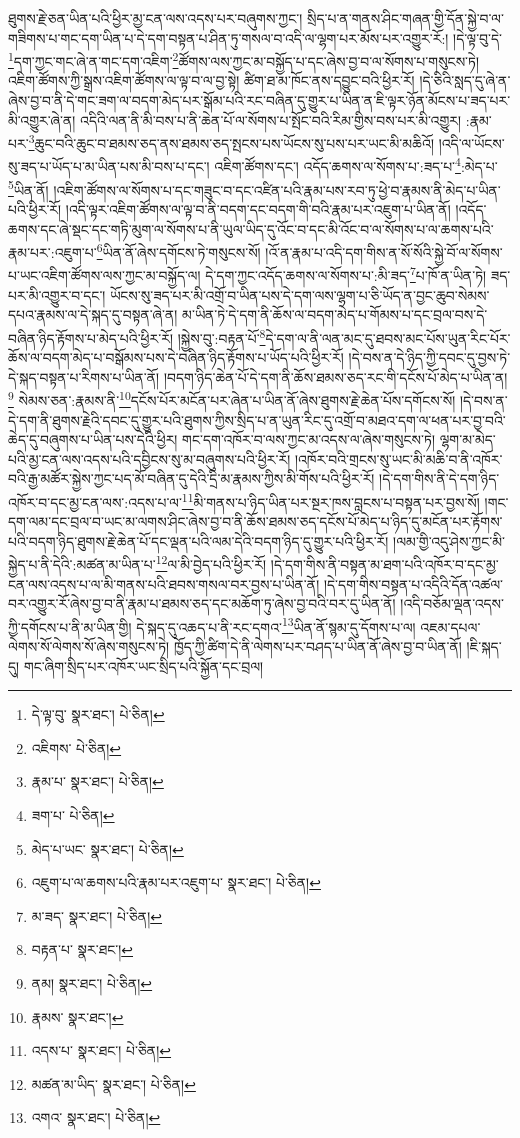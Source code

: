 ཐུགས་རྗེ་ཅན་ཡིན་པའི་ཕྱིར་མྱ་ངན་ལས་འདས་པར་བཞུགས་ཀྱང་། སྲིད་པ་ན་གནས་ཤིང་གཞན་གྱི་དོན་སྐྱེ་བ་ལ་གཟིགས་པ་གང་དག་ཡིན་པ་དེ་དག་བསྟན་པ་ཤིན་ཏུ་གསལ་བ་འདི་ལ་ལྷག་པར་མོས་པར་འགྱུར་རོ:། །དེ་ལྟ་བུ་དེ་\footnote{དེ་ལྟ་བུ་  སྣར་ཐང་།  པེ་ཅིན། }དག་ཀྱང་གང་ཞེ་ན་གང་དག་འཇིག་\footnote{འཇིགས་  པེ་ཅིན། }ཚོགས་ལས་ཀྱང་མ་བསྐྱོད་པ་དང་ཞེས་བྱ་བ་ལ་སོགས་པ་གསུངས་ཏེ། འཇིག་ཚོགས་ཀྱི་སྒྲས་འཇིག་ཚོགས་ལ་ལྟ་བ་ལ་བྱ་སྟེ། ཚིག་ཐ་མ་ཁོང་ནས་དབྱུང་བའི་ཕྱིར་རོ། །དེ་ཅིའི་སླད་དུ་ཞེ་ན་ཞེས་བྱ་བ་ནི་དེ་གང་ཟག་ལ་བདག་མེད་པར་སྒོམ་པའི་རང་བཞིན་དུ་གྱུར་པ་ཡིན་ན་ཇི་ལྟར་ཉོན་མོངས་པ་ཟད་པར་མི་འགྱུར་ཞེ་ན། འདིའི་ལན་ནི་མི་བས་པ་ནི་ཆེན་པོ་ལ་སོགས་པ་སྤོང་བའི་རིམ་གྱིས་བས་པར་མི་འགྱུར། :རྣམ་པར་\footnote{རྣམ་པ་  སྣར་ཐང་།  པེ་ཅིན། }ཆུང་བའི་ཆུང་བ་ཐམས་ཅད་ནས་ཐམས་ཅད་སྤངས་པས་ཡོངས་སུ་པས་པར་ཡང་མི་མཆིའོ། །འདི་ལ་ཡོངས་སུ་ཟད་པ་ཡོད་པ་མ་ཡིན་པས་མི་བས་པ་དང་། འཇིག་ཚོགས་དང་། འདོད་ཆགས་ལ་སོགས་པ་:ཟད་པ་\footnote{ཟག་པ་  པེ་ཅིན། }:མེད་པ་\footnote{མེད་པ་ཡང་  སྣར་ཐང་།  པེ་ཅིན། }ཡིན་ནོ། །འཇིག་ཚོགས་ལ་སོགས་པ་དང་གཟུང་བ་དང་འཛིན་པའི་རྣམ་པས་རབ་ཏུ་ཕྱེ་བ་རྣམས་ནི་མེད་པ་ཡིན་པའི་ཕྱིར་རོ། །འདི་ལྟར་འཇིག་ཚོགས་ལ་ལྟ་བ་ནི་བདག་དང་བདག་གི་བའི་རྣམ་པར་འཇུག་པ་ཡིན་ནོ། །འདོད་ཆགས་དང་ཞེ་སྡང་དང་གཏི་མུག་ལ་སོགས་པ་ནི་ཡུལ་ཡིད་དུ་འོང་བ་དང་མི་འོང་བ་ལ་སོགས་པ་ལ་ཆགས་པའི་རྣམ་པར་:འཇུག་པ་\footnote{འཇུག་པ་ལ་ཆགས་པའི་རྣམ་པར་འཇུག་པ་  སྣར་ཐང་།  པེ་ཅིན། }ཡིན་ནོ་ཞེས་དགོངས་ཏེ་གསུངས་སོ། །འོ་ན་རྣམ་པ་འདི་དག་གིས་ན་སོ་སོའི་སྐྱེ་བོ་ལ་སོགས་པ་ཡང་འཇིག་ཚོགས་ལས་ཀྱང་མ་བསྐྱོད་ལ། དེ་དག་ཀྱང་འདོད་ཆགས་ལ་སོགས་པ་:མི་ཟད་\footnote{མ་ཟད་  སྣར་ཐང་།  པེ་ཅིན། }པ་ཁོ་ན་ཡིན་ཏེ། ཟད་པར་མི་འགྱུར་བ་དང་། ཡོངས་སུ་ཟད་པར་མི་འགྲོ་བ་ཡིན་པས་དེ་དག་ལས་ལྷག་པ་ཅི་ཡོད་ན་བྱང་ཆུབ་སེམས་དཔའ་རྣམས་ལ་དེ་སྐད་དུ་བསྟན་ཞེ་ན། མ་ཡིན་ཏེ་དེ་དག་ནི་ཆོས་ལ་བདག་མེད་པ་གོམས་པ་དང་བྲལ་བས་དེ་བཞིན་ཉིད་རྟོགས་པ་མེད་པའི་ཕྱིར་རོ། །སྐྱེས་བུ་:བརྟན་པོ་\footnote{བརྟན་པ་  སྣར་ཐང་། }དེ་དག་ལ་ནི་ལན་མང་དུ་ཐབས་མང་པོས་ཡུན་རིང་པོར་ཆོས་ལ་བདག་མེད་པ་བསྒོམས་པས་དེ་བཞིན་ཉིད་རྟོགས་པ་ཡོད་པའི་ཕྱིར་རོ། །དེ་བས་ན་དེ་ཉིད་ཀྱི་དབང་དུ་བྱས་ཏེ་དེ་སྐད་བསྟན་པ་རིགས་པ་ཡིན་ནོ། །བདག་ཉིད་ཆེན་པོ་དེ་དག་ནི་ཆོས་ཐམས་ཅད་རང་གི་དངོས་པོ་མེད་པ་ཡིན་ན།\footnote{ནམ།  སྣར་ཐང་།  པེ་ཅིན། } སེམས་ཅན་:རྣམས་ནི་\footnote{རྣམས་  སྣར་ཐང་། }དངོས་པོར་མངོན་པར་ཞེན་པ་ཡིན་ནོ་ཞེས་ཐུགས་རྗེ་ཆེན་པོས་དགོངས་སོ། །དེ་བས་ན་དེ་དག་ནི་ཐུགས་རྗེའི་དབང་དུ་གྱུར་པའི་ཐུགས་ཀྱིས་སྲིད་པ་ན་ཡུན་རིང་དུ་འགྲོ་བ་མཐའ་དག་ལ་ཕན་པར་བྱ་བའི་ཆེད་དུ་བཞུགས་པ་ཡིན་པས་དེའི་ཕྱིར། གང་དག་འཁོར་བ་ལས་ཀྱང་མ་འདས་ལ་ཞེས་གསུངས་ཏེ། ལྷག་མ་མེད་པའི་མྱ་ངན་ལས་འདས་པའི་དབྱིངས་སུ་མ་བཞུགས་པའི་ཕྱིར་རོ། །འཁོར་བའི་གྲངས་སུ་ཡང་མི་མཆི་བ་ནི་འཁོར་བའི་རྒྱ་མཚོར་སྐྱེས་ཀྱང་པད་མོ་བཞིན་དུ་དེའི་དྲི་མ་རྣམས་ཀྱིས་མི་གོས་པའི་ཕྱིར་རོ། །དེ་དག་གིས་ནི་དེ་དག་ཉིད་འཁོར་བ་དང་མྱ་ངན་ལས་:འདས་པ་ལ་\footnote{འདས་པ་  སྣར་ཐང་།  པེ་ཅིན། }མི་གནས་པ་ཉིད་ཡིན་པར་སྔར་ཁས་བླངས་པ་བསྟན་པར་བྱས་སོ། །གང་དག་ལམ་དང་བྲལ་བ་ཡང་མ་ལགས་ཤིང་ཞེས་བྱ་བ་ནི་ཆོས་ཐམས་ཅད་དངོས་པོ་མེད་པ་ཉིད་དུ་མངོན་པར་རྟོགས་པའི་བདག་ཉིད་ཐུགས་རྗེ་ཆེན་པོ་དང་ལྡན་པའི་ལམ་དེའི་བདག་ཉིད་དུ་གྱུར་པའི་ཕྱིར་རོ། །ལམ་གྱི་འདུ་ཤེས་ཀྱང་མི་སྐྱེད་པ་ནི་དེའི་:མཚན་མ་ཡིན་པ་\footnote{མཚན་མ་ཡིད་  སྣར་ཐང་།  པེ་ཅིན། }ལ་མི་བྱེད་པའི་ཕྱིར་རོ། །དེ་དག་གིས་ནི་བསྟན་མ་ཐག་པའི་འཁོར་བ་དང་མྱ་ངན་ལས་འདས་པ་ལ་མི་གནས་པའི་ཐབས་གསལ་བར་བྱས་པ་ཡིན་ནོ། །དེ་དག་གིས་བསྟན་པ་འདིའི་དོན་འཚལ་བར་འགྱུར་རོ་ཞེས་བྱ་བ་ནི་རྣམ་པ་ཐམས་ཅད་དང་མཆོག་ཏུ་ཞེས་བྱ་བའི་བར་དུ་ཡིན་ནོ། །འདི་བཅོམ་ལྡན་འདས་ཀྱི་དགོངས་པ་ནི་མ་ཡིན་གྱི། དེ་སྐད་དུ་འཆད་པ་ནི་རང་དགའ་\footnote{འགའ་  སྣར་ཐང་།  པེ་ཅིན། }ཡིན་ནོ་སྙམ་དུ་དོགས་པ་ལ། འཇམ་དཔལ་ལེགས་སོ་ལེགས་སོ་ཞེས་གསུངས་ཏེ། ཁྱོད་ཀྱི་ཚིག་དེ་ནི་ལེགས་པར་བཤད་པ་ཡིན་ནོ་ཞེས་བྱ་བ་ཡིན་ནོ། །ཇི་སྐད་དུ། གང་ཞིག་སྲིད་པར་འཁོར་ཡང་སྲིད་པའི་སྐྱོན་དང་བྲལ། 